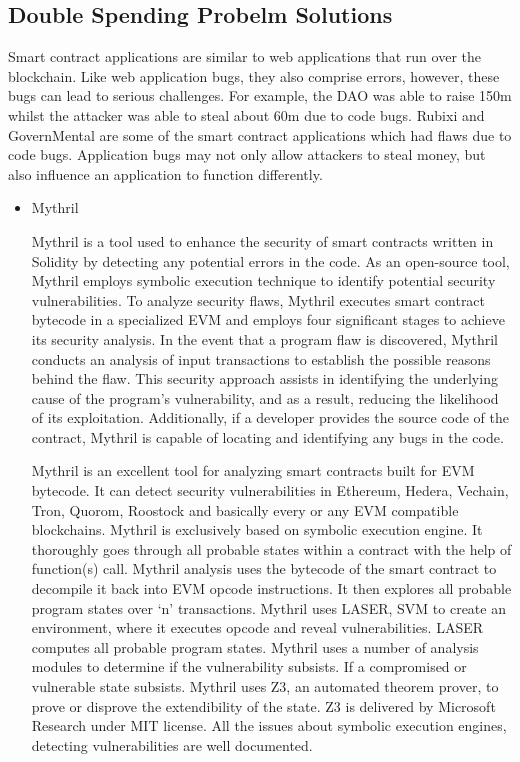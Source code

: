 \subsection{Double Spending Probelm Solutions} 
 Smart contract applications are similar to web applications that run over the blockchain. Like web application bugs, they also comprise errors, however, these bugs can lead to serious challenges. For example, the \ac{DAO} was able to raise 150m whilst the attacker was able to steal about 60m due to code bugs. Rubixi and GovernMental are some of the smart contract applications which had flaws due to code bugs. Application bugs may not only allow attackers to steal money, but also influence an application to function differently.
\begin{itemize}
  \item Mythril

Mythril is a tool used to enhance the security of smart contracts written in Solidity by detecting any potential errors in the code. As an open-source tool, Mythril employs symbolic execution technique to identify potential security vulnerabilities. To analyze security flaws, Mythril executes smart contract bytecode in a specialized \ac{EVM} and employs four significant stages to achieve its security analysis. In the event that a program flaw is discovered, Mythril conducts an analysis of input transactions to establish the possible reasons behind the flaw. This security approach assists in identifying the underlying cause of the program's vulnerability, and as a result, reducing the likelihood of its exploitation. Additionally, if a developer provides the source code of the contract, Mythril is capable of locating and identifying any bugs in the code.


Mythril is an excellent tool for analyzing smart contracts built for \ac{EVM} bytecode. It can detect security vulnerabilities in Ethereum, Hedera, Vechain, Tron, Quorom, Roostock and basically every or any \ac{EVM} compatible blockchains. Mythril is exclusively based on symbolic execution engine. It thoroughly goes through all probable states within a contract with the help of function(s) call. Mythril analysis uses the bytecode of the smart contract to decompile it back into \ac{EVM} opcode instructions. It then explores all probable program states over ‘n’ transactions. Mythril uses LASER, \ac{SVM} to create an environment, where it executes opcode and reveal vulnerabilities. LASER computes all probable program states. Mythril uses a number of analysis modules to determine if the vulnerability subsists. If a compromised or vulnerable state subsists. Mythril uses Z3, an automated theorem prover, to prove or disprove the extendibility of the state. Z3 is delivered by Microsoft Research under \ac{MIT} license. All the issues about symbolic execution engines, detecting vulnerabilities are well documented.


\end{itemize}
